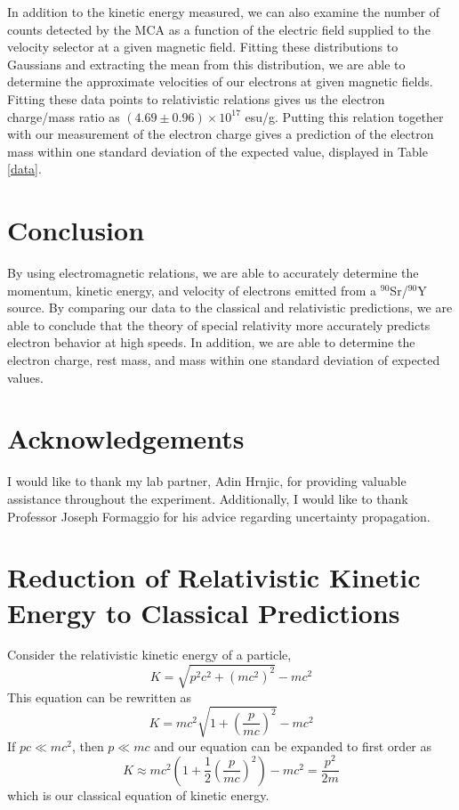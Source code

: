 In addition to the kinetic energy measured, we can also examine the number of counts detected by the MCA as a function of the electric field supplied to the velocity selector at a given magnetic field. Fitting these distributions to Gaussians and extracting the mean from this distribution, we are able to determine the approximate velocities of our electrons at given magnetic fields. Fitting these data points to relativistic relations gives us the electron charge/mass ratio as $(4.69 \pm 0.96) \times 10^{17}$ esu/g. Putting this relation together with our measurement of the electron charge gives a prediction of the electron mass within one standard deviation of the expected value, displayed in Table \ref{data}.

\section{Conclusion}
By using electromagnetic relations, we are able to accurately determine the momentum, kinetic energy, and velocity of electrons emitted from a $^{90}$Sr/$^{90}$Y source. By comparing our data to the classical and relativistic predictions, we are able to conclude that the theory of special relativity more accurately predicts electron behavior at high speeds. In addition, we are able to determine the electron charge, rest mass, and mass within one standard deviation of expected values. %

\section{Acknowledgements}
I would like to thank my lab partner, Adin Hrnjic, for providing valuable assistance throughout the experiment. Additionally, I would like to thank Professor Joseph Formaggio for his advice regarding uncertainty propagation. 




\clearpage
\appendix
\section{Reduction of Relativistic Kinetic Energy to Classical Predictions}
Consider the relativistic kinetic energy of a particle,
\begin{equation}
  K = \sqrt{p^2 c^2 + (mc^2)^2} - mc^2
\end{equation}
This equation can be rewritten as
\begin{equation}
  K = mc^2 \sqrt{1 + \left(\frac{p}{mc}\right)^2} - mc^2
\end{equation}
If $pc \ll mc^2$, then $p \ll mc$ and our equation can be expanded to first order as
\begin{equation}
  K \approx  mc^2 \left(1 + \frac{1}{2} \left(\frac{p}{mc}\right)^2 \right) - mc^2 = \frac{p^2}{2m}
\end{equation}
which is our classical equation of kinetic energy.

